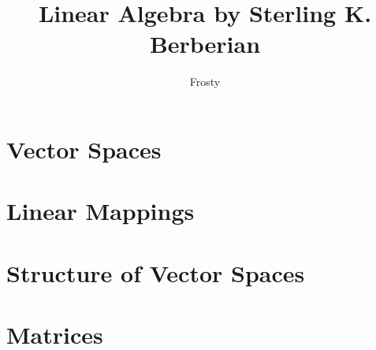 \documentclass[10pt]{article}  %
\title{Linear Algebra by Sterling K. Berberian}
\author{Frosty}
\begin{document}
\maketitle

\tableofcontents

\section{Vector Spaces}

\section{Linear Mappings}

\section{Structure of Vector Spaces}

\section{Matrices}

\end{document}
